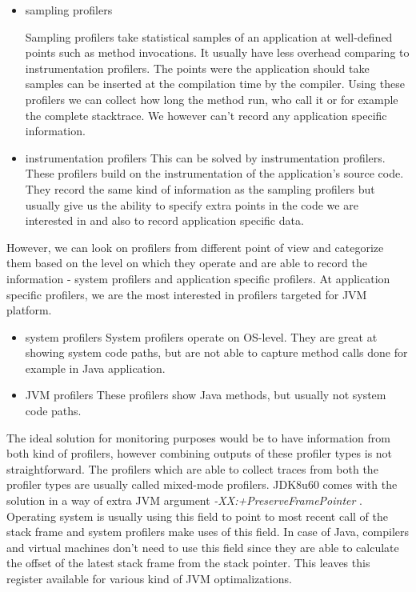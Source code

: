 \begin{itemize}
	\item sampling profilers

Sampling profilers take statistical samples of an application at well-defined points such as method invocations. It usually have less overhead comparing to instrumentation profilers. The points were the application should take samples can be inserted at the compilation time by the compiler. Using these profilers we can collect how long the method run, who call it or for example the complete stacktrace. We however can't record any application specific information.
\item instrumentation profilers
This can be solved by instrumentation profilers. These profilers build on the instrumentation of the application's source code. They record the same kind of information as the sampling profilers but usually give us the ability to specify extra points in the code we are interested in and also to record application specific data.
\end{itemize}


However, we can look on profilers from different point of view and categorize them based on the level on which they operate and are able to record the information - system profilers and application specific profilers. 
At application specific profilers, we are the most interested in profilers targeted for JVM platform.
\begin{itemize}
	\item system profilers
	System profilers operate on OS-level. They are great at showing system code paths, but are not able to capture method calls done for example in Java application.
	\item JVM profilers
	These profilers show Java methods, but usually not system code paths.
\end{itemize}
The ideal solution for monitoring purposes would be to have information from both kind of profilers, however combining outputs of these profiler types is not straightforward. The profilers which are able to collect traces from both the profiler types are usually called mixed-mode profilers. JDK8u60 comes with the solution in a way of extra JVM argument \textit{-XX:+PreserveFramePointer} \cite{MixedModeProfilers}.  Operating system is usually using this field to point to most recent call of the stack frame and system profilers make uses of this field. In case of Java, compilers and virtual machines don't need to use this field since they are able to calculate the offset of the latest stack frame from the stack pointer. This leaves this register available for various kind of JVM optimalizations.

